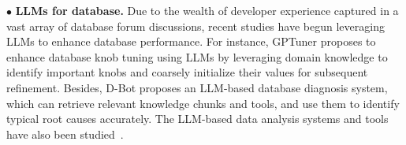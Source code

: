 


$\bullet$ \textbf{LLMs for database.}  Due to the wealth of developer experience captured in a vast array of database forum discussions, recent studies \cite{zhou2023d,lao2023gptuner,fan2024combining,zhou2024db,lillm,sun2024r,chen2024automatic,giannankouris2024lambda,li2025agenttune,stolz2023galois} have begun leveraging LLMs to enhance database performance. 
For instance, GPTuner \cite{lao2023gptuner} proposes to enhance database knob
tuning using LLMs by leveraging domain knowledge to identify
important knobs and coarsely initialize their values for subsequent
refinement. 
Besides, D-Bot \cite{zhou2023d} proposes an LLM-based database
diagnosis system, which can retrieve relevant knowledge chunks
and tools, and use them to identify typical root causes accurately.
The LLM-based data analysis systems and tools have also been studied~\cite{liang2025revisiting,liu2025palimpchat,anderson2024design,lin2025twix,lin2024towards,patel2024lotus,liu2024declarative,chen2023seed,hong2025datainterpreter,li2023sheetcopilot,li2024autodcworkflow,zhang2024jellyfish,gao2024texttosql,yan2025mctuner}.

